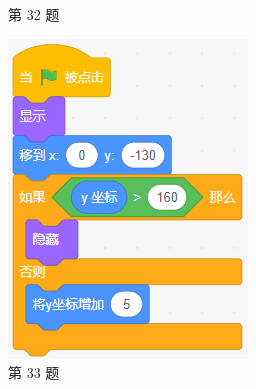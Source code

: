 \documentclass[10pt, a4paper]{article}
\begin{document}
\begin{enumerate}
\begin{figure}[htbp]
\begin{minipage}[t]{.4\textwidth}
\begin{minipage}[t]{.45\textwidth}
                \end{minipage}
                \caption*{第 32 题}
            \end{minipage}
            \begin{minipage}[t]{.17\textwidth}
                \centering
                \includegraphics[width=\textwidth]{figure/33.png}
                \caption*{第 33 题}
            \end{minipage}
            \begin{minipage}[t]{.14\textwidth}
                \centering

\end{minipage}
\end{figure}
\end{enumerate}
\end{document}
